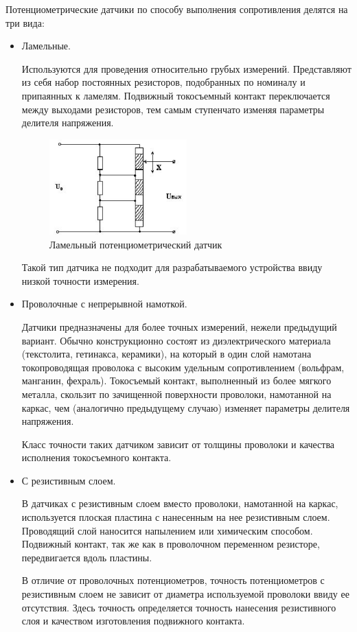 Потенциометрические датчики по способу выполнения сопротивления делятся на три вида:
\begin{itemize}

    \item Ламельные.

    Используются для проведения относительно грубых измерений.
    Представляют из себя набор постоянных резисторов, подобранных по номиналу и припаянных к ламелям.
    Подвижный токосъемный контакт переключается между выходами резисторов, тем самым ступенчато изменяя параметры делителя напряжения.

    \begin{figure}[!h]
        \centering
        \includegraphics[width=0.5\textwidth]{img/img_2}
        \caption{Ламельный потенциометрический датчик}
        \label{fig:img_2}
    \end{figure}

    Такой тип датчика не подходит для разрабатываемого устройства ввиду низкой точности измерения.

    \item Проволочные с непрерывной намоткой.

    Датчики предназначены для более точных измерений, нежели предыдущий вариант.
    Обычно конструкционно состоят из диэлектрического материала (текстолита, гетинакса, керамики), на который в один слой намотана токопроводящая проволока с высоким удельным сопротивлением (вольфрам, манганин, фехраль).
    Токосъемый контакт, выполненный из более мягкого металла, скользит по зачищенной поверхности проволоки, намотанной на каркас, чем (аналогично предыдущему случаю) изменяет параметры делителя напряжения.

    Класс точности таких датчиком зависит от толщины проволоки и качества исполнения токосъемного контакта.
    \item С резистивным слоем.

    В датчиках с резистивным слоем вместо проволоки, намотанной на каркас, используется плоская пластина с нанесенным на нее резистивным слоем.
    Проводящий слой наносится напылением или химическим способом.
    Подвижный контакт, так же как в проволочном переменном резисторе, передвигается вдоль пластины.

    В отличие от проволочных потенциометров, точность потенциометров с резистивным слоем не зависит от диаметра используемой проволоки ввиду ее отсутствия.
    Здесь точность определяется точность нанесения резистивного слоя и качеством изготовления подвижного контакта.

\end{itemize}


